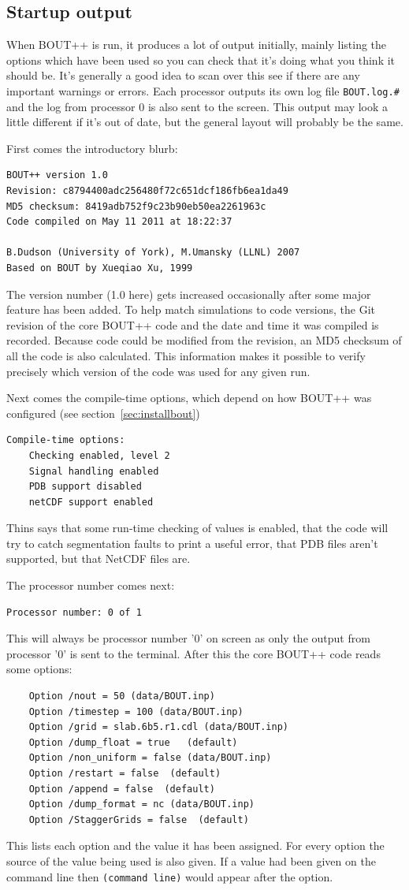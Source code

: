 \documentclass[12pt]{article}
\begin{document}
\subsection{Startup output}

When BOUT++ is run, it produces a lot of output initially, mainly listing
the options which have been used so you can check that it's doing what you
think it should be. It's generally a good idea to scan over this
see if there are any important warnings or errors. Each processor outputs
its own log file \texttt{BOUT.log.\#}
and the log from processor 0 is also sent to the screen. This output may
look a little different if it's out of date, but the general layout will
probably be the same.

First comes the introductory blurb:
\begin{verbatim}
BOUT++ version 1.0
Revision: c8794400adc256480f72c651dcf186fb6ea1da49
MD5 checksum: 8419adb752f9c23b90eb50ea2261963c
Code compiled on May 11 2011 at 18:22:37

B.Dudson (University of York), M.Umansky (LLNL) 2007
Based on BOUT by Xueqiao Xu, 1999
\end{verbatim}
The version number (1.0 here) gets increased occasionally after
some major feature has been added. To help match simulations to code versions,
the Git revision of the core BOUT++ code and the date and time it was
compiled is recorded. Because code could be modified from the revision,
an MD5 checksum of all the code is also calculated. This information
makes it possible to verify precisely which version of the code was used
for any given run.

Next comes the compile-time options, which depend on how
BOUT++ was configured (see section~\ref{sec:installbout})
\begin{verbatim}
Compile-time options:
	Checking enabled, level 2
	Signal handling enabled
	PDB support disabled
	netCDF support enabled
\end{verbatim}
Thins says that some run-time checking of values is enabled,
that the code will try to catch segmentation faults to print a useful
error, that PDB files aren't supported, but that NetCDF files are.

The processor number comes next:
\begin{verbatim}
Processor number: 0 of 1
\end{verbatim}
This will always be processor number '0' on screen as only the output
from processor '0' is sent to the terminal. After this
the core BOUT++ code reads some options:
\begin{verbatim}
	Option /nout = 50 (data/BOUT.inp)
	Option /timestep = 100 (data/BOUT.inp)
	Option /grid = slab.6b5.r1.cdl (data/BOUT.inp)
	Option /dump_float = true   (default)
	Option /non_uniform = false (data/BOUT.inp)
	Option /restart = false  (default)
	Option /append = false  (default)
	Option /dump_format = nc (data/BOUT.inp)
	Option /StaggerGrids = false  (default)
\end{verbatim}
This lists each option and the value it has been assigned.
For every option the source of the value being used is also given.
If a value had been given on the command line then \texttt{(command line)}
would appear after the option.
\end{document}
